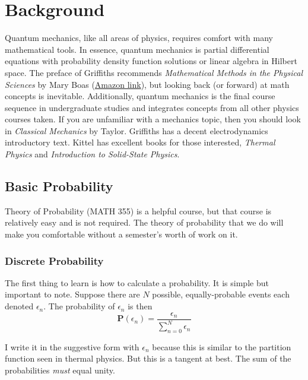 \chapter{Background}
Quantum mechanics, like all areas of physics, requires comfort with many mathematical tools. In essence, quantum mechanics is partial differential equations with probability density function solutions or linear algebra in Hilbert space. The preface of Griffiths recommends \textit{Mathematical Methods in the Physical Sciences} by Mary Boas (\href{https://www.amazon.com/Mathematical-Methods-Physical-Sciences-Mary/dp/0471198269}{Amazon link}), but looking back (or forward) at math concepts is inevitable. Additionally, quantum mechanics is the final course sequence in undergraduate studies and integrates concepts from all other physics courses taken. If you are unfamiliar with a mechanics topic, then you should look in \textit{Classical Mechanics} by Taylor. Griffiths has a decent electrodynamics introductory text. Kittel has excellent books for those interested, \textit{Thermal Physics} and \textit{Introduction to Solid-State Physics}.



\section{Basic Probability}
Theory of Probability (MATH 355) is a helpful course, but that course is relatively easy and is not required. The theory of probability that we do will make you comfortable without a semester's worth of work on it.

\subsection{Discrete Probability}
The first thing to learn is how to calculate a probability. It is simple but important to note. Suppose there are $N$ possible, equally-probable events each denoted $\epsilon_n$. The probability of $\epsilon_n$ is then
\begin{equation}
    \mathbf{P}(\epsilon_n) = \frac{\epsilon_n}{\sum_{n=0}^N \epsilon_n}
\end{equation}

I write it in the suggestive form with $\epsilon_n$ because this is similar to the partition function seen in thermal physics. But this is a tangent at best. The sum of the probabilities \textit{must} equal unity.

